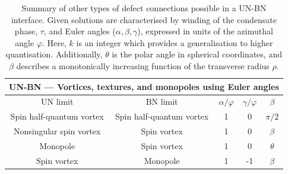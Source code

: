 \begin{table}
    \centering
    \begin{tabular}{ccccc}
        \toprule
        \multicolumn{5}{c}{UN-BN --- Vortices, textures, and monopoles using
        Euler angles} \\
        \midrule
        UN limit & BN limit &  \(\alpha/\varphi \) & \(\gamma/\varphi \)
            & \(\beta \) \\
        \midrule
        Spin half-quantum vortex & Spin half-quantum vortex & 1 & 0
            & \(\pi/2\) \\
        Nonsingular spin vortex & Spin vortex & 1 & 0
            & \(\beta\) \\
        Monopole & Spin vortex & 1  & 0 & \(\theta \) \\
        Spin vortex & Monopole & 1 & -1 & \(\beta\) \\ 
        \bottomrule
    \end{tabular}
    \caption[Examples of monopole and nonsingular vortex connections across a
    uniaxial nematic to biaxial nematic interface]
    {\label{tab: UN-BN-nonsingular}
    Summary of other types of defect connections possible in a UN-BN interface.
    Given solutions are characterised by winding of the condensate phase,
    \(\tau \), and Euler angles (\(\alpha, \beta, \gamma \)), expressed in units
    of the azimuthal angle \(\varphi \).
    Here, \(k\) is an integer which provides a generalisation to higher
    quantisation.
    Additionally, \(\theta \) is the polar angle in spherical coordinates, and
    \(\beta\) describes a monotonically increasing function of the
    transverse radius \(\rho \).}
\end{table}

